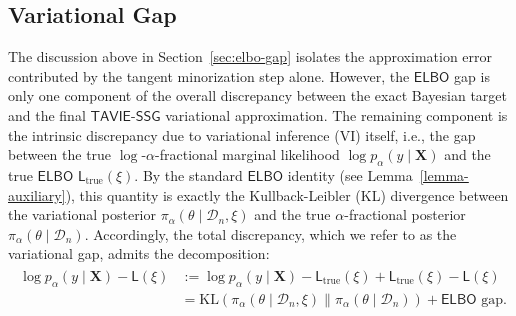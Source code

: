 \documentclass[12pt]{article}
\numberwithin{equation}{section}
\newcommand{\tssg}{\mathsf{TAVIE}\text{-}\mathsf{SSG}}
\begin{document}
\subsection{Variational Gap}\label{subsec:variational-gap}

The discussion above in Section~\ref{sec:elbo-gap} isolates the approximation error contributed by the tangent minorization step alone. However, the $\mathsf{ELBO}$ gap is only one component of the overall discrepancy between the exact Bayesian target and the final $\tssg$ variational approximation. The remaining component is the intrinsic discrepancy due to variational inference (VI) itself, i.e., the gap between the true $\log$-$\alpha$-fractional marginal likelihood $\log p_{\alpha}(y\mid \mathbf{X})$ and the true $\mathsf{ELBO}$ $\mathsf{L}_{\mathrm{true}}(\xi)$. By the standard $\mathsf{ELBO}$ identity (see Lemma~\ref{lemma-auxiliary}), this quantity is exactly the Kullback-Leibler (KL) divergence between the variational posterior $\pi_{\alpha}(\theta \mid \mathcal{D}_n, \xi)$ and the true $\alpha$-fractional posterior $\pi_{\alpha}(\theta\mid \mathcal D_n)$. Accordingly, the total discrepancy, which we refer to as the variational gap, admits the decomposition:
\begin{align}
\label{eq:variational-gap}
\begin{split}
    \log p_{\alpha}(y\mid \mathbf{X}) - \mathsf{L}(\xi) &:= \log p_{\alpha}(y\mid \mathbf{X}) - \mathsf{L}_{\mathrm{true}}(\xi) + \mathsf{L}_{\mathrm{true}}(\xi) - \mathsf{L}(\xi)\\
    &=\mathrm{KL}(\pi_{\alpha}(\theta \mid \mathcal{D}_n, \xi)\parallel \pi_{\alpha}(\theta \mid \mathcal{D}_n)) + \mathsf{ELBO}\text{ gap}.
\end{split}
\end{align}
\end{document}
